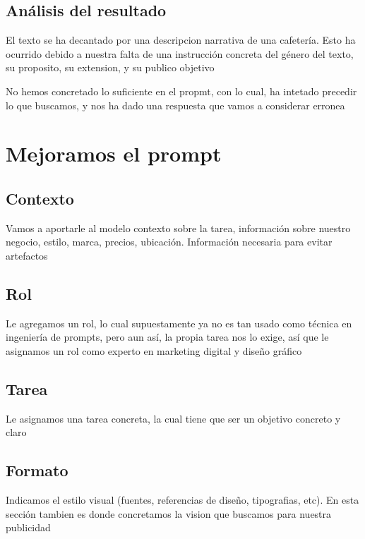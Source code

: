 \documentclass[12pt,a4paper]{article}
\begin{document}
\subsection{Análisis del resultado}

El texto se ha decantado por una descripcion narrativa de una cafetería. Esto ha
ocurrido debido a nuestra falta de una instrucción concreta del género del texto, su proposito, su extension, y su publico objetivo

\begin{observacion}
No hemos concretado lo suficiente en el propmt, con lo cual, ha intetado precedir
lo que buscamos, y nos ha dado una respuesta que vamos a considerar erronea
\end{observacion}

\section{Mejoramos el prompt}

\subsection{Contexto}

Vamos a aportarle al modelo contexto sobre la tarea, información sobre nuestro
negocio, estilo, marca, precios, ubicación. Información necesaria para evitar artefactos

\subsection{Rol}

Le agregamos un rol, lo cual supuestamente ya no es tan usado como técnica en ingeniería de prompts, pero aun así, la propia tarea nos lo exige, así que le asignamos un rol como experto en
marketing digital y diseño gráfico

\subsection{Tarea}

Le asignamos una tarea concreta, la cual tiene que ser un objetivo concreto y claro

\subsection{Formato}

Indicamos el estilo visual (fuentes, referencias de diseño, tipografias,
etc). En esta sección tambien es donde concretamos la vision que buscamos para nuestra
publicidad
\end{document}
